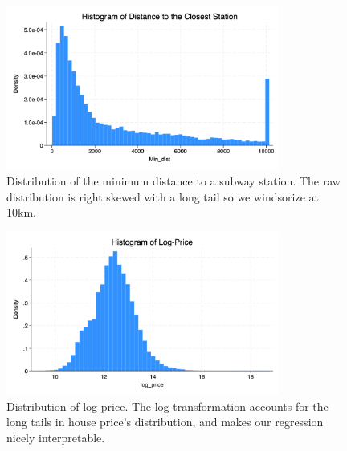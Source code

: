 \begin{figure}
    \centering
    \includegraphics[width=0.8\textwidth]{../figs/hist_min_dist.png}
    \caption{Distribution of the minimum distance to a subway station. The raw distribution is right skewed with a long tail so we windsorize at 10km.}
    \label{min_dist_distribution}
\end{figure}

\begin{figure}
    \centering
    \includegraphics[width=0.8\textwidth]{../figs/hist_log_price.png}
    \caption{Distribution of log price. The log transformation accounts for the long tails in house price's distribution, and makes our regression nicely interpretable.}
    \label{log_price_distribution}
\end{figure}

